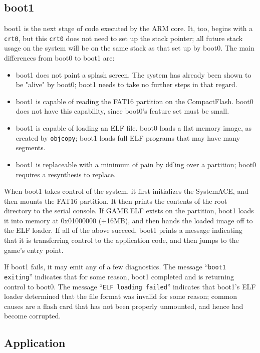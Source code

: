\documentclass[10pt]{article}
\begin{document}
\subsection{boot1}

boot1 is the next stage of code executed by the ARM core. It, too, begins
with a \texttt{crt0}, but this \texttt{crt0} does not need to set up the
stack pointer; all future stack usage on the system will be on the same
stack as that set up by boot0.  The main differences from boot0 to boot1
are:

\begin{itemize}
\item{boot1 does not paint a splash screen. The system has already been
shown to be "alive" by boot0; boot1 needs to take no further steps in that
regard.}
\item{boot1 is capable of reading the FAT16 partition on the CompactFlash.
boot0 does not have this capability, since boot0's feature set must be
small.}
\item{boot1 is capable of loading an ELF file. boot0 loads a flat memory
image, as created by \texttt{objcopy}; boot1 loads full ELF programs that
may have many segments.}
\item{boot1 is replaceable with a minimum of pain by \texttt{dd}'ing over a
partition; boot0 requires a resynthesis to replace.}
\end{itemize}

When boot1 takes control of the system, it first initializes the SystemACE,
and then mounts the FAT16 partition. It then prints the contents of the root
directory to the serial console. If GAME.ELF exists on the partition, boot1
loads it into memory at 0x01000000 (+16MB), and then hands the loaded image
off to the ELF loader. If all of the above succeed, boot1 prints a message
indicating that it is transferring control to the application code, and then
jumps to the game's entry point.

If boot1 fails, it may emit any of a few diagnostics. The message
``\texttt{boot1 exiting}'' indicates that for some reason, boot1 completed
and is returning control to boot0.  The message ``\texttt{ELF loading
failed}'' indicates that boot1's ELF loader determined that the file format
was invalid for some reason; common causes are a flash card that has not
been properly unmounted, and hence had become corrupted.

\subsection{Application}
\end{document}
